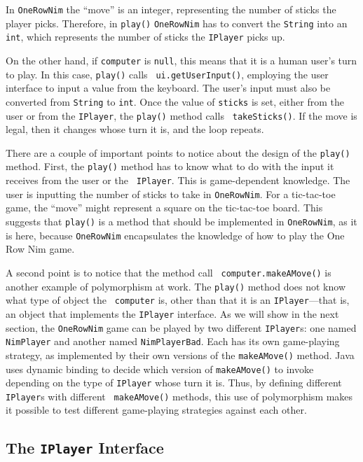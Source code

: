 \noindent In {\tt OneRowNim} the ``move'' is an integer, representing
the number of sticks the player picks. Therefore, in {\tt play()}
{\tt OneRowNim} has to convert the {\tt String} into an {\tt int}, which
represents the number of sticks the {\tt IPlayer} picks up.  

On the other hand, if {\tt computer} is {\tt null}, this means that it
is a human user's turn to play. In this case, {\tt play()} calls {\tt
ui.getUserInput()}, employing the user interface to input a value from the
keyboard.  The user's input must also be converted from {\tt String}
to {\tt int}.  Once the value of {\tt sticks} is set, either from the
user or from the {\tt IPlayer}, the {\tt play()} method calls {\tt
takeSticks()}. If the move is legal, then it changes whose turn it is,
and the loop repeats.

There are a couple of important points to notice about the design of
the {\tt play()} method. First, the {\tt play()} method has to know
what to do with the input it receives from the user or the {\tt
IPlayer}.  This is game-dependent knowledge. The user is inputting the
number of sticks to take in {\tt OneRowNim}. For a tic-tac-toe game,
the ``move'' might represent a square on the tic-tac-toe board. This
suggests that {\tt play()} is a method that should be implemented in
{\tt OneRowNim}, as it is here, because {\tt OneRowNim} encapsulates
the knowledge of how to play the One Row Nim game.

A second point is to notice that the method call {\tt
computer.make\-AMove()} is another example of polymorphism at work.
The {\tt play()} method does not know what type of object the {\tt
computer} is, other than that it is an {\tt IPlayer}---that is, an
object that implements the {\tt IPlayer} interface. As we will show in
the next section, the {\tt OneRowNim} game can be played by two
different {\tt IPlayer}s: one named {\tt NimPlayer} and another named
{\tt NimPlayerBad}.  Each has its own game-playing strategy, as
implemented by their own versions of the {\tt makeAMove()} method.
Java uses dynamic binding to decide which version of {\tt makeAMove()}
to invoke depending on the type of {\tt IPlayer} whose turn it is.
Thus, by defining different {\tt IPlayer}s with different {\tt
makeAMove()} methods, this use of polymorphism makes it possible to
test different game-playing strategies against each other.

\subsection{The {\tt IPlayer} Interface}

